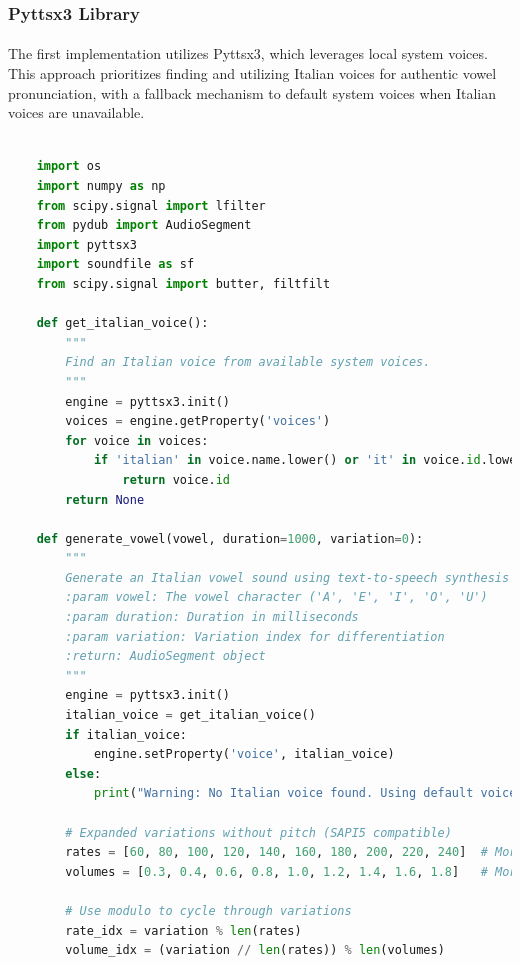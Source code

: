\subsubsection{Pyttsx3 Library}
\paragraph{}
The first implementation utilizes Pyttsx3, which leverages local system voices. This approach prioritizes finding and utilizing Italian voices for authentic vowel pronunciation, with a fallback mechanism to default system voices when Italian voices are unavailable.

\begin{lstlisting}[language=Python, caption={Audio Generation with pyttsx3}]

    import os
    import numpy as np
    from scipy.signal import lfilter
    from pydub import AudioSegment
    import pyttsx3
    import soundfile as sf
    from scipy.signal import butter, filtfilt
    
    def get_italian_voice():
        """
        Find an Italian voice from available system voices.
        """
        engine = pyttsx3.init()
        voices = engine.getProperty('voices')
        for voice in voices:
            if 'italian' in voice.name.lower() or 'it' in voice.id.lower():
                return voice.id
        return None
    
    def generate_vowel(vowel, duration=1000, variation=0):
        """
        Generate an Italian vowel sound using text-to-speech synthesis with significant variations.
        :param vowel: The vowel character ('A', 'E', 'I', 'O', 'U')
        :param duration: Duration in milliseconds
        :param variation: Variation index for differentiation
        :return: AudioSegment object
        """
        engine = pyttsx3.init()
        italian_voice = get_italian_voice()
        if italian_voice:
            engine.setProperty('voice', italian_voice)
        else:
            print("Warning: No Italian voice found. Using default voice.")
        
        # Expanded variations without pitch (SAPI5 compatible)
        rates = [60, 80, 100, 120, 140, 160, 180, 200, 220, 240]  # More speed variations
        volumes = [0.3, 0.4, 0.6, 0.8, 1.0, 1.2, 1.4, 1.6, 1.8]   # More volume variations
        
        # Use modulo to cycle through variations
        rate_idx = variation % len(rates)
        volume_idx = (variation // len(rates)) % len(volumes)
        

\end{lstlisting}
